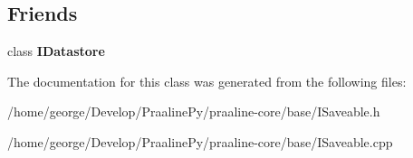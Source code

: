 \subsection*{Friends}
\begin{DoxyCompactItemize}
\item 
\mbox{\label{class_i_saveable_a7fb1d877ef84ef89784bab8a2cc6b0e2}} 
class {\bfseries I\+Datastore}
\end{DoxyCompactItemize}


The documentation for this class was generated from the following files\+:\begin{DoxyCompactItemize}
\item 
/home/george/\+Develop/\+Praaline\+Py/praaline-\/core/base/I\+Saveable.\+h\item 
/home/george/\+Develop/\+Praaline\+Py/praaline-\/core/base/I\+Saveable.\+cpp\end{DoxyCompactItemize}
